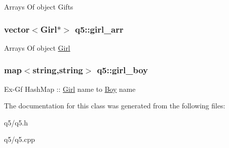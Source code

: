 Arrays Of object Gifts \hypertarget{classq5_a7f23e107f01723bf7fb80d338ce9fa55}{
\subsubsection[{girl\-\_\-arr}]{\setlength{\rightskip}{0pt plus 5cm}vector$<${\bf Girl}$\ast$$>$ q5\-::girl\-\_\-arr}}\label{classq5_a7f23e107f01723bf7fb80d338ce9fa55}
Arrays Of object \hyperlink{class_girl}{Girl} \hypertarget{classq5_a9c1ac801609ad161c2a33c7e5cea45bf}{
\subsubsection[{girl\-\_\-boy}]{\setlength{\rightskip}{0pt plus 5cm}map$<$string,string$>$ q5\-::girl\-\_\-boy}}\label{classq5_a9c1ac801609ad161c2a33c7e5cea45bf}
Ex-\/\-Gf Hash\-Map \-:\-: \hyperlink{class_girl}{Girl} name to \hyperlink{class_boy}{Boy} name 

The documentation for this class was generated from the following files\-:\begin{DoxyCompactItemize}
\item 
q5/q5.\-h\item 
q5/q5.\-cpp\end{DoxyCompactItemize}
